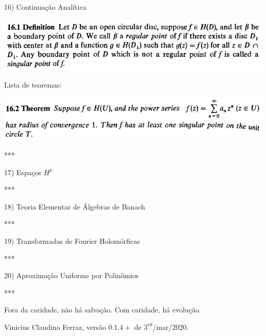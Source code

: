 \documentclass[12pt]{article}
\begin{document}
\vspace{3mm}

16) Continua\c{c}\~ao Anal\'itica

\vspace{3mm}

		\begin{center}
		\includegraphics{d16ponto1}
		\end{center}

Lista de teoremas:

		\begin{center}
		\includegraphics{16ponto2}
		\end{center}

***

\vspace{3mm}

17) Espa\c{c}os $H^p$

\vspace{3mm}

***

\vspace{3mm}

18) Teoria Elementar de \'Algebras de Banach

\vspace{3mm}

***

\vspace{3mm}

19) Transformadas de Fourier Holom\'orficas

\vspace{3mm}

***

\vspace{3mm}

20) Aproxima\c{c}\~ao Uniforme por Polin\^omios

\vspace{3mm}

***

\vspace{3mm}

Fora da caridade, n\~ao h\'a salva\c{c}\~ao. Com caridade, h\'a evolu\c{c}\~ao.

Vinicius Claudino Ferraz, vers\~ao $0.1.4+$ de $3^{rd}$/mar/2020.
\end{document}
